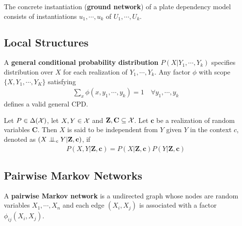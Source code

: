 \documentclass[11pt]{article}
\begin{document}
	\begin{definition}
		The concrete instantiation (\textbf{ground network}) of a plate dependency model consists of instantiations $u_1, \cdots, u_k$ of $U_1, \cdots, U_k$.
	\end{definition}
	
	\subsection{Local Structures}
	\begin{definition}
		A \textbf{general conditional probability distribution} $P(X|Y_1, \cdots, Y_k)$ specifies distribution over $X$ for each realization of $Y_1, \cdots, Y_k$. Any factor $\phi$ with scope $\{X, Y_1, \cdots, Y_K\}$ satisfying
		\begin{align}
			\sum_x \phi(x, y_1, \cdots, y_k) = 1\quad \forall y_1, \cdots, y_k
		\end{align}
		defines a valid general CPD.
	\end{definition}
	
	\begin{definition}
		Let $P \in \Delta(\mathcal{{X}})$, let $X, Y \in \mathcal{{X}}$ and $\textbf{Z}, \textbf{C} \subseteq \mathcal{{X}}$. Let $\textbf{c}$ be a realization of random variables $\textbf{C}$. Then $X$ is said to be independent from $Y$ given $Y$ in the context $c$, denoted as $(X \perp \!\!\! \perp_c Y|\textbf{Z}, \textbf{c})$, if
		\begin{align}
			P(X, Y | \textbf{Z}, \textbf{c}) = P(X| \textbf{Z}, \textbf{c}) P(Y| \textbf{Z}, \textbf{c})
		\end{align}
	\end{definition}
	
	\subsection{Pairwise Markov Networks}
	\begin{definition}
		A \textbf{pairwise Markov network} is a undirected graph whose nodes are random variables $X_1, \cdots, X_n$ and each edge $(X_i, X_j)$ is associated with a factor $\phi_{ij}(X_i, X_j)$.
	\end{definition}
\end{document}
